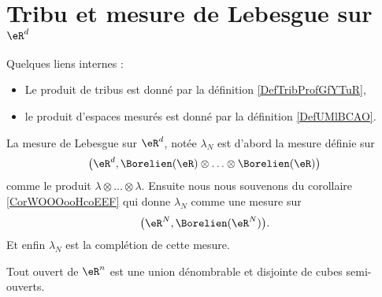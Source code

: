 \section{Tribu et mesure de Lebesgue sur \texorpdfstring{$ \eR^d$}{Rd}}

Quelques liens internes :
\begin{itemize}
    \item Le produit de tribus est donné par la définition \ref{DefTribProfGfYTuR},     %
    \item le produit d'espaces mesurés est donné par la définition \ref{DefUMlBCAO}.     %
\end{itemize}

La mesure de Lebesgue sur \( \eR^d\), notée \( \lambda_N\) est d'abord la mesure définie sur
\begin{equation}
 \big( \eR^d,\Borelien(\eR)\otimes\ldots\otimes\Borelien(\eR) \big)
\end{equation}
comme le produit \( \lambda\otimes\ldots\otimes \lambda\). Ensuite nous nous souvenons du corollaire \ref{CorWOOOooHcoEEF} qui donne \( \lambda_N\) comme une mesure sur
\begin{equation}
 \big( \eR^N,\Borelien(\eR^N) \big).
\end{equation}
Et enfin \( \lambda_N\) est la complétion de cette mesure.

\begin{proposition}     \label{PropSKXGooRFHQst}
    Tout ouvert de \( \eR^n\) est une union dénombrable et disjointe de cubes semi-ouverts.
\end{proposition}

